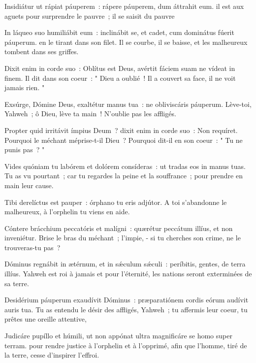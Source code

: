 \begin{paracol}{2}
    \LigneParacol{0.2cm}
    {Insidiátur ut rápiat páuperem~: \GreStar{} rápere páuperem, dum áttrahit eum.}
    {il est aux aguets pour surprendre le pauvre~; il se saisit du pauvre}

    \LigneParacol{0.2cm}
    {In láqueo suo humiliábit eum~: \GreStar{} inclinábit se, et cadet, cum dominátus fúerit páuperum.}
    {en le tirant dans son filet. Il se courbe, il se baisse, et les malheureux tombent dans ses griffes. }

    \LigneParacol{0.2cm}
    {Dixit enim in corde suo~: Oblítus est Deus, \GreStar{} avértit fáciem suam ne vídeat in finem.}
    {Il dit dans son coeur~: " Dieu a oublié~! Il a couvert sa face, il ne voit jamais rien. " }

\end{paracol}
\Gloria
\begin{paracol}{2}

    \LigneParacol{0cm}
    {Exsúrge, Dómine Deus, exaltétur manus tua~: \GreStar{} ne obliviscáris páuperum.}
    {Lève-toi, Yahweh~; ô Dieu, lève ta main~! N'oublie pas les affligés. }

    \LigneParacol{0.2cm}
    {Propter quid irritávit ímpius Deum~? \GreStar{} dixit enim in corde suo~: Non requíret.}
    {Pourquoi le méchant méprise-t-il Dieu~? Pourquoi dit-il en son coeur~: " Tu ne punis pas~? " }

    \LigneParacol{0.2cm}
    {Vides quóniam tu labórem et dolórem consíderas~: \GreStar{} ut tradas eos in manus tuas.}
    {Tu as vu pourtant~; car tu regardes la peine et la souffrance~; pour prendre en main leur cause.}

    \LigneParacol{0.2cm}
    {Tibi derelíctus est pauper~: \GreStar{} órphano tu eris adjútor.}
    {A toi s'abandonne le malheureux, à l'orphelin tu viens en aide. }

    \LigneParacol{0.2cm}
    {Cóntere brácchium peccatóris et malígni~: \GreStar{} quærétur peccátum illíus, et non inveniétur.}
    {Brise le bras du méchant~; l'impie, - si tu cherches son crime, ne le trouveras-tu pas~?}

    \LigneParacol{0.2cm}
    {Dóminus regnábit in ætérnum, et in sǽculum sǽculi~: \GreStar{} períbitis, gentes, de terra illíus.}
    {Yahweh est roi à jamais et pour l'éternité, les nations seront exterminées de sa terre. }

    \LigneParacol{0.2cm}
    {Desidérium páuperum exaudívit Dóminus~: \GreStar{} præparatiónem cordis eórum audívit auris tua.}
    {Tu as entendu le désir des affligés, Yahweh~; tu affermis leur coeur, tu prêtes une oreille attentive, }

    \LigneParacol{0.2cm}
    {Judicáre pupíllo et húmili, \GreStar{} ut non appónat ultra magnificáre se homo super terram.}
    {pour rendre justice à l'orphelin et à l'opprimé, afin que l'homme, tiré de la terre, cesse d'inspirer l'effroi. }

\end{paracol}
